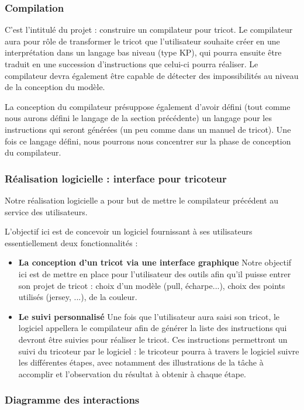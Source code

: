 \documentclass{article}
\begin{document}
\subsubsection{Compilation}

C'est l'intitulé du projet : construire un compilateur pour tricot. Le compilateur aura pour rôle de transformer le tricot que
l'utilisateur souhaite créer en une interprétation dans un langage bas niveau (type KP), qui pourra ensuite être traduit en une succession
d'instructions que celui-ci pourra réaliser.
Le compilateur devra également être capable de détecter des impossibilités au niveau de la conception du modèle.

La conception du compilateur présuppose également d'avoir défini (tout comme nous aurons défini le langage de la section précédente) un
langage pour les instructions qui seront générées (un peu comme dans un manuel de tricot).
Une fois ce langage défini, nous pourrons nous concentrer sur la phase de conception du compilateur.

\subsubsection{Réalisation logicielle : interface pour tricoteur}

Notre réalisation logicielle a pour but de mettre le compilateur précédent au service des utilisateurs.

L'objectif ici est de concevoir un logiciel fournissant à ses utilisateurs essentiellement deux fonctionnalités :
\begin{itemize}
  \item \textbf{La conception d'un tricot via une interface graphique} Notre objectif ici est de mettre en place pour l'utilisateur des
  outils afin qu'il puisse entrer son projet de tricot : choix d'un modèle (pull, écharpe...), choix des points utilisés
  (jersey, ...), de la couleur.
  \item \textbf{Le suivi personnalisé} Une fois que l'utilisateur aura saisi son tricot, le logiciel appellera le compilateur afin de générer
la liste des instructions qui devront être suivies pour réaliser le tricot. Ces instructions permettront un suivi du tricoteur par le
logiciel : le tricoteur pourra à travers le logiciel suivre les différentes étapes, avec notamment des illustrations de la tâche à
accomplir et l'observation du résultat à obtenir à chaque étape.
\end{itemize}

\subsubsection{Diagramme des interactions}
\end{document}
